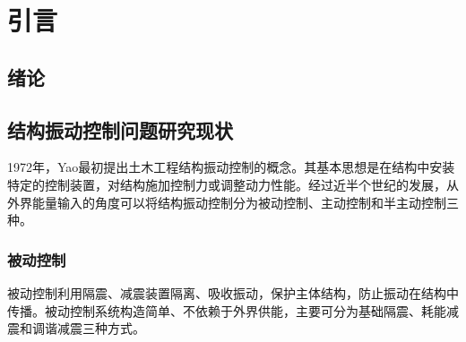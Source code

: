 \section{引言}
\subsection{绪论}
\subsection{结构振动控制问题研究现状}
1972年，Yao最初提出土木工程结构振动控制的概念\cite{yao1972concept}。其基本思想是在结构中安装特定的控制装置，对结构施加控制力或调整动力性能。经过近半个世纪的发展，从外界能量输入的角度可以将结构振动控制分为被动控制、主动控制和半主动控制三种。

\subsubsection{被动控制}
被动控制利用隔震、减震装置隔离、吸收振动，保护主体结构，防止振动在结构中传播。被动控制系统构造简单、不依赖于外界供能，主要可分为基础隔震、耗能减震和调谐减震三种方式\cite{Zhou1997}。
